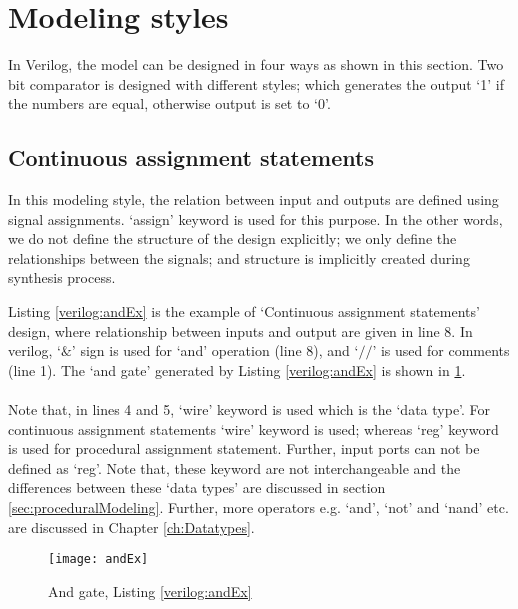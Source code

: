 \section{Modeling styles} \label{sec:ModelingStyles}
In Verilog, the model can be designed in four ways as shown in this section. Two bit comparator is designed with different styles; which generates the output `1' if the numbers are equal, otherwise output is set to `0'.   

\subsection{Continuous assignment statements}
In this modeling style, the relation between input and outputs are defined using signal assignments. `assign' keyword is used for this purpose. In the other words, we do not define the structure of the design explicitly; we only define the relationships between the signals; and structure is implicitly created during synthesis process. 

\begin{explanation}
	Listing \ref{verilog:andEx} is the example of `Continuous assignment statements' design, where relationship between inputs and output are given in line 8. In verilog, `$\&$' sign is used for `and' operation (line 8), and `$//$' is used for comments (line 1). The `and gate' generated by Listing \ref{verilog:andEx} is shown in \ref{fig:andEx}. 
	\\ \\
	Note that, in lines 4 and 5, `wire' keyword is used which is the `data type'. For continuous assignment statements `wire' keyword is used; whereas `reg' keyword is used for procedural assignment statement. Further, input ports can not be defined as `reg'. Note that, these keyword are not interchangeable and the differences between these `data types' are discussed in section \ref{sec:proceduralModeling}. Further, more operators e.g. `and', `not' and `nand' etc. are discussed in Chapter \ref{ch:Datatypes}. 
\end{explanation}



\begin{figure}[!h]
	\centering
	\texttt{[image: andEx]}
	\caption{And gate, Listing \ref{verilog:andEx}}
	\label{fig:andEx}
\end{figure}

